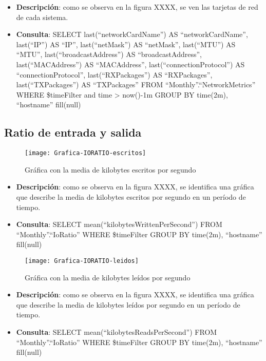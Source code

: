 \documentclass[ spanish, a4paper, 12pt, oneside]{report}
\begin{document}
\begin{itemize}
   \item \textbf{Descripción}: como se observa en la figura XXXX, se ven las tarjetas de red de cada sistema.
   \item \textbf{Consulta}: SELECT last(``networkCardName'') AS ``networkCardName'', last(``IP'') AS ``IP'', last(``netMask'') AS ``netMask'', last(``MTU'') AS ``MTU'', last(``broadcastAddress'') AS ``broadcastAddress'', last(``MACAddress'') AS ``MACAddress'', last(``connectionProtocol'') AS ``connectionProtocol'', last(``RXPackages'') AS ``RXPackages'', last(``TXPackages'') AS ``TXPackages'' FROM ``Monthly''.``NetworkMetrics'' WHERE \$timeFilter  and time > now()-1m GROUP BY time(2m), ``hostname'' fill(null)
\end{itemize}

\subsection{Ratio de entrada y salida}

\begin{figure}[!h]
   \centering
   \texttt{[image: Grafica-IORATIO-escritos]}\\
      \caption{\label{fig: Gráfica con la media de kilobytes escritos por segundo} Gráfica con la media de kilobytes escritos por segundo}
\end{figure}

\begin{itemize}
   \item \textbf{Descripción}: como se observa en la figura XXXX, se identifica una gráfica que describe la media de kilobytes escritos por segundo en un período de tiempo.
   \item \textbf{Consulta}: SELECT mean(``kilobytesWrittenPerSecond'') FROM ``Monthly''.``IoRatio'' WHERE \$timeFilter GROUP BY time(2m), ``hostname'' fill(null)
\end{itemize}

\begin{figure}[!h]
   \centering
   \texttt{[image: Grafica-IORATIO-leidos]}\\
      \caption{\label{fig: Gráfica con la media de kilobytes leídos por segundo} Gráfica con la media de kilobytes leídos por segundo}
\end{figure}

\begin{itemize}
   \item \textbf{Descripción}: como se observa en la figura XXXX, se identifica una gráfica que describe la media de kilobytes leídos por segundo en un período de tiempo.
   \item \textbf{Consulta}: SELECT mean(``kilobytesReadsPerSecond'') FROM ``Monthly''.``IoRatio'' WHERE \$timeFilter GROUP BY time(2m), ``hostname'' fill(null)
\end{itemize}
\end{document}
